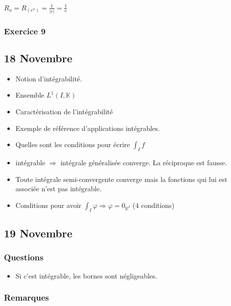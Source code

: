 \documentclass[a4paper, 11pt, hidelinks]{article}
\begin{document}
$R_a=R_{(e^n)}=\frac{1}{|e|}=\frac{1}{e}$



\subsubsection{Exercice 9}



\subsection{18 Novembre}

\begin{itemize}
    \item Notion d'intégrabilité.
    \item Ensemble $L^1(I,\mathbb{K})$
    \item Caractérisation de l'intégrabilité 
    \item Exemple de référence d'applications intégrables.
    \item Quelles sont les conditions pour écrire $\int_{I} f$
    \item intégrable $\Rightarrow$ intégrale généralisée converge. La réciproque est fausse.
    \item Toute intégrale semi-convergente converge mais la fonctions qui lui est associée n'est pas intégrable.
    \item Conditions pour avoir $\int_{I} \varphi \Rightarrow \varphi =0_{\mathbb{R}^I}$ (4 conditions)
\end{itemize}





\subsection{19 Novembre}


\subsubsection{Questions}


\begin{itemize}
    \item Si c'est intégrable, les bornes sont négligeables.
\end{itemize}


\subsubsection{Remarques}
\end{document}
